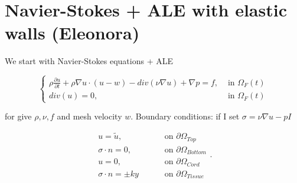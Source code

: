 \documentclass[11pt,a4paper,titlepage]{report}
\begin{document}
%
%
%

\section{Navier-Stokes + ALE with elastic walls (Eleonora)}
We start with Navier-Stokes equations + ALE

\[
\left\{  
\begin{aligned}
\rho \frac{\partial u}{\partial t} + \rho \nabla u \cdot (u-w) - div(\nu \nabla u) + \nabla p = f, & \text{ in } \Omega_F (t) \\
div(u) = 0, & \text{ in } \Omega_F(t)
\end{aligned}
\right.
\]

for give $\rho, \nu, f$ and mesh velocity $w$.
Boundary conditions: if I set $\sigma = \nu \nabla u - pI $

\[
\begin{aligned}
u = \tilde{u}, & \qquad \text{ on } \partial \Omega_{Top} \\
\sigma \cdot n = 0, & \qquad \text{ on } \partial \Omega_{Bottom} \\
u = 0, & \qquad \text{ on } \partial \Omega_{Cord} \\
\sigma \cdot n = \pm ky & \qquad \text{ on }  \partial \Omega_{Tissue}
\end{aligned}.
\]
\end{document}
